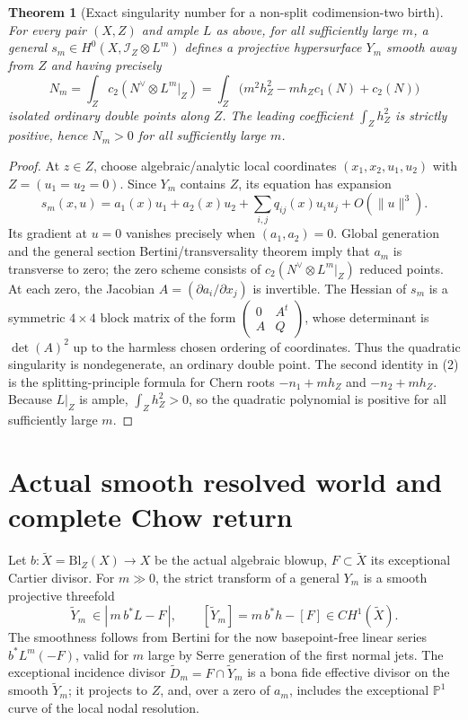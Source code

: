 \documentclass[11pt]{article}
\newtheorem{theorem}{Theorem}
\begin{document}
\begin{theorem}[Exact singularity number for a non-split codimension-two birth]
For every pair $(X,Z)$ and ample $L$ as above, for all
sufficiently large $m$, a general
$s_m\in H^0(X,\mathcal I_Z\otimes L^m)$ defines a
projective hypersurface $Y_m$ smooth away from $Z$
and having precisely
\[
 \boxed{
 N_m=\int_Z c_2(N^\vee\otimes L^m|_Z)
  =\int_Z\bigl(m^2h_Z^2-mh_Zc_1(N)+c_2(N)\bigr)
 } \tag{2}
\]
isolated ordinary double points along $Z$.
The leading coefficient $\int_Zh_Z^2$ is strictly
positive, hence $N_m>0$ for all sufficiently large $m$.
\end{theorem}
\begin{proof}
At $z\in Z$, choose algebraic/analytic local coordinates
$(x_1,x_2,u_1,u_2)$ with $Z=(u_1=u_2=0)$.
Since $Y_m$ contains $Z$, its equation has expansion
\[
 s_m(x,u)=a_1(x)u_1+a_2(x)u_2
           +\sum_{i,j}q_{ij}(x)u_i u_j+O(\lVert u\rVert^3).
 \tag{3}
\]
Its gradient at $u=0$ vanishes precisely when
$(a_1,a_2)=0$. Global generation and the general section
Bertini/transversality theorem imply that $a_m$ is
transverse to zero; the zero scheme consists of
$c_2(N^\vee\otimes L^m|_Z)$ reduced points.
At each zero, the Jacobian
$A=(\partial a_i/\partial x_j)$ is invertible.
The Hessian of $s_m$ is a symmetric $4\times4$ block
matrix of the form
$\left(\begin{smallmatrix}0&A^t\\A&Q\end{smallmatrix}\right)$,
whose determinant is $\det(A)^2$ up to the harmless
chosen ordering of coordinates. Thus the quadratic
singularity is nondegenerate, an ordinary double point.
The second identity in (2) is the splitting-principle
formula for Chern roots $-n_1+mh_Z$ and $-n_2+mh_Z$.
Because $L|_Z$ is ample, $\int_Zh_Z^2>0$, so the quadratic
polynomial is positive for all sufficiently large $m$.
\end{proof}

\section{Actual smooth resolved world and complete Chow return}
Let $b:\widetilde X=\mathrm{Bl}_Z(X)\to X$ be the actual
algebraic blowup, $F\subset\widetilde X$ its exceptional
Cartier divisor. For $m\gg0$, the strict transform of
a general $Y_m$ is a smooth projective threefold
\[
 \widetilde Y_m\ \in |\,m\,b^*L-F\,|,
 \qquad [\widetilde Y_m]=m\,b^*h-[F]\in CH^1(\widetilde X).
\]
The smoothness follows from Bertini for the now basepoint-free
linear series $b^*L^m(-F)$, valid for $m$ large by Serre
generation of the first normal jets. The exceptional incidence
divisor $\widetilde D_m=F\cap\widetilde Y_m$ is a bona fide
effective divisor on the smooth $\widetilde Y_m$; it projects
to $Z$, and, over a zero of $a_m$, includes the exceptional
$\mathbb P^1$ curve of the local nodal resolution.
\end{document}
